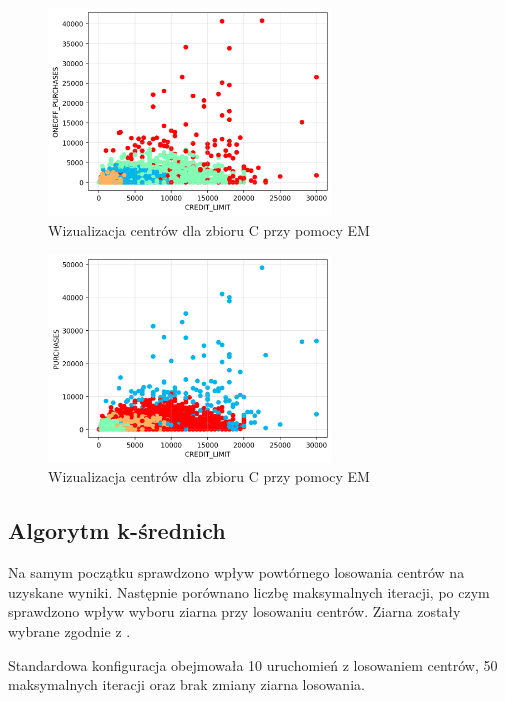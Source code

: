 \documentclass[a4paper,11pt]{article}
\begin{document}
\begin{figure}[H]
    \centering
    \includegraphics[width=0.67\textwidth]{images2/EM/cc/ExpectationMaximization_CC_xCREDIT_LIMIT_yONEOFF_PURCHASES.png}
    \caption{Wizualizacja centrów dla zbioru C przy pomocy EM}
    \label{fig:em_c_2}
\end{figure}


\begin{figure}[H]
    \centering
    \includegraphics[width=0.67\textwidth]{images2/EM/cc/ExpectationMaximization_CC_xCREDIT_LIMIT_yPURCHASES.png}
    \caption{Wizualizacja centrów dla zbioru C przy pomocy EM}
    \label{fig:em_c_3}
\end{figure}

\subsection{Algorytm k-średnich}

Na samym początku sprawdzono wpływ powtórnego losowania centrów na uzyskane wyniki. Następnie porównano liczbę maksymalnych iteracji, po czym sprawdzono wpływ wyboru ziarna przy losowaniu centrów. Ziarna zostały wybrane zgodnie z \cite{KmeansSeeds}.

Standardowa konfiguracja obejmowała 10 uruchomień z losowaniem centrów, 50 maksymalnych iteracji oraz brak zmiany ziarna losowania.
\end{document}
